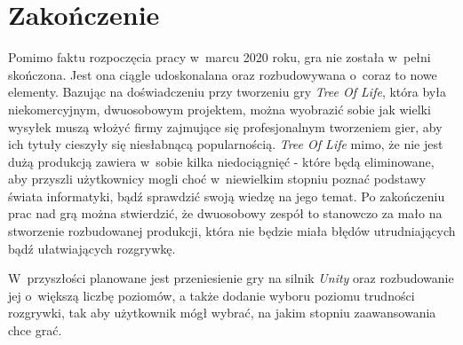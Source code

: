 \documentclass[12pt,a4paper,oneside]{book}
\theoremstyle{definition}
\numberwithin{equation}{chapter}
\begin{document}
\chapter*{Zakończenie}
\par Pomimo faktu rozpoczęcia pracy w~marcu 2020 roku, gra nie została w~pełni skończona. Jest ona ciągle udoskonalana oraz rozbudowywana o~coraz to nowe elementy. Bazując na doświadczeniu przy tworzeniu gry \textit{Tree Of Life}, która była niekomercyjnym, dwuosobowym projektem, można wyobrazić sobie jak wielki wysyłek muszą włożyć firmy zajmujące się profesjonalnym tworzeniem gier, aby ich tytuły cieszyły się niesłabnącą popularnością. \textit{Tree Of Life} mimo, że nie jest dużą produkcją zawiera w~sobie kilka niedociągnięć - które będą eliminowane, aby przyszli użytkownicy mogli choć w~niewielkim stopniu poznać podstawy świata informatyki, bądź sprawdzić swoją wiedzę na jego temat. Po zakończeniu prac nad grą można stwierdzić, że dwuosobowy zespół to stanowczo za mało na stworzenie rozbudowanej produkcji, która nie będzie miała błędów utrudniających bądź ułatwiających rozgrywkę.

\par W~przyszłości planowane jest przeniesienie gry na silnik \textit{Unity} oraz rozbudowanie jej o~większą liczbę poziomów, a także dodanie wyboru poziomu trudności rozgrywki, tak aby użytkownik mógł wybrać, na jakim stopniu zaawansowania chce grać. 




\listoffigures
{}
\end{document}
